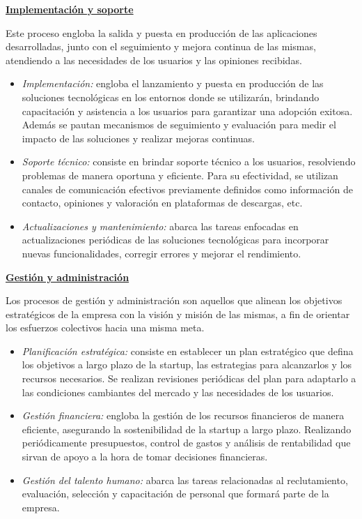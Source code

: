 \documentclass[a4paper,12pt]{article}
\begin{document}
    \noindent \textbf{\underline{Implementación y soporte}}

    Este proceso engloba la salida y puesta en producción de las aplicaciones desarrolladas, junto con el seguimiento y mejora continua de las mismas, atendiendo a las necesidades de los usuarios y las opiniones recibidas.
    \begin{itemize}
        \item[] \textit{Implementación:} engloba el lanzamiento y puesta en producción de las soluciones tecnológicas en los entornos donde se utilizarán, brindando capacitación y asistencia a los usuarios para garantizar una adopción exitosa. Además se pautan mecanismos de seguimiento y evaluación para medir el impacto de las soluciones y realizar mejoras continuas.
        \item[] \textit{Soporte técnico:} consiste en brindar soporte técnico a los usuarios, resolviendo problemas de manera oportuna y eficiente. Para su efectividad, se utilizan canales de comunicación efectivos previamente definidos como información de contacto, opiniones y valoración en plataformas de descargas, etc.
        \item[] \textit{Actualizaciones y mantenimiento:} abarca las tareas enfocadas en actualizaciones periódicas de las soluciones tecnológicas para incorporar nuevas funcionalidades, corregir errores y mejorar el rendimiento.
    \end{itemize}

    \noindent \textbf{\underline{Gestión y administración}}

    Los procesos de gestión y administración son aquellos que alinean los objetivos estratégicos de la empresa con la visión y misión de las mismas, a fin de orientar los esfuerzos colectivos hacia una misma meta.
    \begin{itemize}
        \item[] \textit{Planificación estratégica:} consiste en establecer un plan estratégico que defina los objetivos a largo plazo de la startup, las estrategias para alcanzarlos y los recursos necesarios. Se realizan revisiones periódicas del plan para adaptarlo a las condiciones cambiantes del mercado y las necesidades de los usuarios.
        \item[] \textit{Gestión financiera:} engloba la gestión de los recursos financieros de manera eficiente, asegurando la sostenibilidad de la startup a largo plazo. Realizando periódicamente presupuestos, control de gastos y análisis de rentabilidad que sirvan de apoyo a la hora de tomar decisiones financieras.
        \item[] \textit{Gestión del talento humano:} abarca las tareas relacionadas al reclutamiento, evaluación, selección y capacitación de personal que formará parte de la empresa.
    \end{itemize}
\end{document}
